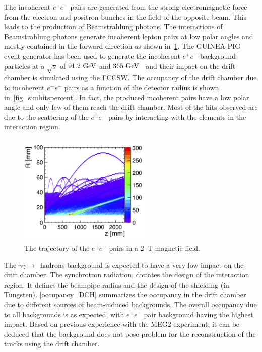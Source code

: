\documentclass[conference]{IEEEtran}
\begin{document}
The incoherent $e^+e^-$ pairs are generated from the strong electromagnetic force from the electron and positron bunches in the field of the opposite beam. This leads to the production of Beamstrahlung photons. The interactions of Beamstrahlung photons generate incoherent lepton pairs at low polar angles and mostly contained in the forward direction as shown in~\cref{fig_pairbcg}. The \textsc{GUINEA-PIG}~\cite{Schulte:382453} event generator has been used to generate the incoherent $e^+e^-$ background particles at a $\sqrt{s}$ of $91.2\,\mathrm{\,Ge\kern -0.1em V}$ and $365\,\mathrm{\,Ge\kern -0.1em V}$~\cite{Voutsinas:2017eca} and their impact on the drift chamber is simulated using the FCCSW. The occupancy of the drift chamber due to incoherent $e^+e^-$ pairs as a function of the detector radius is shown in~\cref{fig_simhitspercent}. In fact, the produced incoherent pairs have a low polar angle and only few of them reach the drift chamber. Most of the hits observed are due to the scattering of the $e^+e^-$ pairs by interacting with the elements in the interaction region.


\begin{figure}[!h]
\centering
\includegraphics[width=2.5in]{figures/pairs_R_Z.png}
\caption{The trajectory of the $e^+e^-$ pairs in a 2~T magnetic field.}
\label{fig_pairbcg}
\end{figure}



The $\gamma\gamma\rightarrow$~hadrons background is expected to have a very low impact on the drift chamber. The synchrotron radiation, dictates the design of the interaction region. It defines the beampipe radius and the design of the shielding (in Tungsten).
\cref{occupancy_DCH} summarizes the occupancy in the drift chamber due to different sources of beam-induced backgrounds. The overall occupancy due to all backgrounds is as expected, with $e^+e^-$ pair background having the highest impact. Based on previous experience with the MEG2 experiment, it can be deduced that the background does not pose problem for the reconstruction of the tracks using the drift chamber.
\end{document}
